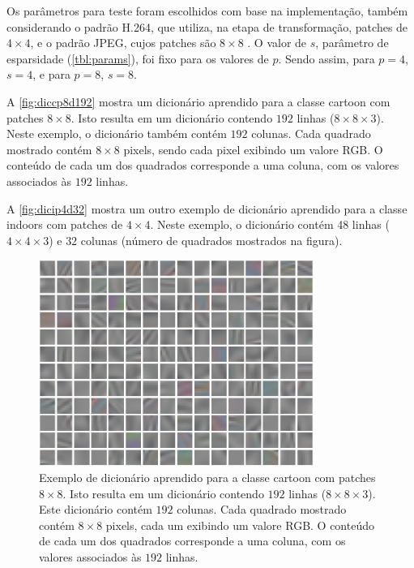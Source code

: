\documentclass[cic,tc]{iiufrgs}
\begin{document}
Os parâmetros para teste foram escolhidos com base na implementação, também considerando 
o padrão H.264, que utiliza, na etapa de transformação, patches de $4\times4$, 
e o padrão JPEG, cujos patches são $8\times8$ \cite{mitchell1992digital}.
O valor de $s$, parâmetro de esparsidade (\autoref{tbl:params}), foi fixo para os valores de $p$. 
Sendo assim, para $p=4$, $s=4$, e para $p=8$, $s=8$.

A \autoref{fig:diccp8d192} mostra um dicionário aprendido para a classe cartoon com patches $8\times8$. 
Isto resulta em um dicionário contendo $192$ linhas ($8\times8\times3$). 
Neste exemplo, o dicionário também contém $192$ colunas. 
Cada quadrado mostrado contém $8\times8$ pixels, sendo cada pixel exibindo um valore RGB.
O conteúdo de cada um dos quadrados corresponde a uma coluna, com os valores associados às $192$ linhas. 

A \autoref{fig:dicip4d32} mostra um outro exemplo de dicionário aprendido para a classe indoors com patches de $4\times4$. 
Neste exemplo, o dicionário contém 48 linhas ($4\times4\times3$) e 
$32$ colunas (número de quadrados mostrados na figura).

\begin{figure}[H]
    \caption{Exemplo de dicionário aprendido para a classe cartoon com patches $8\times8$. 
    Isto resulta em um dicionário contendo $192$ linhas ($8\times8\times3$). 
    Este dicionário contém $192$ colunas. 
    Cada quadrado mostrado contém $8\times8$ pixels, 
    cada um exibindo um valore RGB.
    O conteúdo de cada um dos quadrados corresponde a uma coluna, com os valores 
    associados às $192$ linhas.}
    \begin{center}
           \includegraphics[width=0.8\textwidth]{img/cartoon_p8_d192.png}
    \end{center}
    \label{fig:diccp8d192}
\end{figure}
\end{document}
